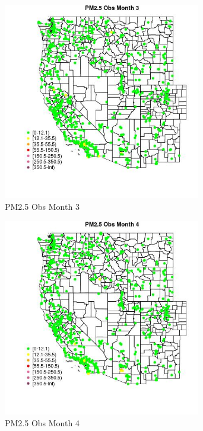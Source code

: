 \begin{figure} 
\centering  
\includegraphics[width=0.77\textwidth]{Code_Outputs/Report_ML_input_PM25_Step4_part_e_de_duplicated_aves_compiled_2019-05-21wNAs_MapObsMo3PM25_Obs.jpg} 
\caption{\label{fig:Report_ML_input_PM25_Step4_part_e_de_duplicated_aves_compiled_2019-05-21wNAsMapObsMo3PM25_Obs}PM2.5 Obs Month 3} 
\end{figure} 
 

\begin{figure} 
\centering  
\includegraphics[width=0.77\textwidth]{Code_Outputs/Report_ML_input_PM25_Step4_part_e_de_duplicated_aves_compiled_2019-05-21wNAs_MapObsMo4PM25_Obs.jpg} 
\caption{\label{fig:Report_ML_input_PM25_Step4_part_e_de_duplicated_aves_compiled_2019-05-21wNAsMapObsMo4PM25_Obs}PM2.5 Obs Month 4} 
\end{figure} 
 

